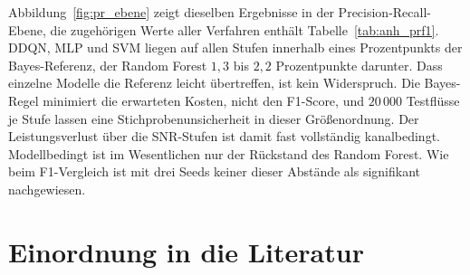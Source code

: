 Abbildung~\ref{fig:pr_ebene} zeigt dieselben Ergebnisse in der Precision-Recall-Ebene, die zugehörigen Werte aller Verfahren enthält Tabelle~\ref{tab:anh_prf1}. DDQN, MLP und SVM liegen auf allen Stufen innerhalb eines Prozentpunkts der Bayes-Referenz, der Random Forest $1{,}3$ bis $2{,}2$ Prozentpunkte darunter. Dass einzelne Modelle die Referenz leicht übertreffen, ist kein Widerspruch. Die Bayes-Regel minimiert die erwarteten Kosten, nicht den F1-Score, und $20\,000$ Testflüsse je Stufe lassen eine Stichprobenunsicherheit in dieser Größenordnung. Der Leistungsverlust über die SNR-Stufen ist damit fast vollständig kanalbedingt. Modellbedingt ist im Wesentlichen nur der Rückstand des Random Forest. Wie beim F1-Vergleich ist mit drei Seeds keiner dieser Abstände als signifikant nachgewiesen.

\section{Einordnung in die Literatur}
\label{sec:ergebnisse_literatur}

